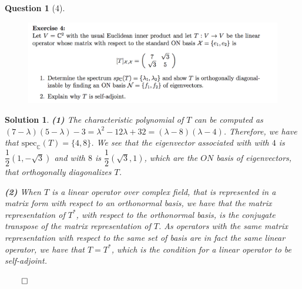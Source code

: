 \documentclass{article} %
\theoremstyle{quest}
\newtheorem*{question}{Question}
\newtheorem*{solution}{Solution}
\begin{document}
\begin{question}[4]
\hfill
\begin{figure}[h!]
  \centering
    \includegraphics[width=1\textwidth]{LA-4-4.png}
\end{figure}
\end{question}
\begin{solution}
\textbf{(1)} The characteristic polynomial of $T$ can be computed as $(7 - \lambda)(5 - \lambda) -3
= \lambda^2 - 12\lambda + 32 = (\lambda - 8)(\lambda - 4)$. Therefore, we have that 
$\text{spec}_{\mathbb{C}}(T) = \{ 4, 8\}$. We see that the eigenvector associated with 
with $4$ is $\dfrac{1}{2}(1,-\sqrt{3})$ and with $8$ is $\dfrac{1}{2}(\sqrt{3},1)$, which 
are the $ON$ basis of eigenvectors, that orthogonally diagonalizes $T$. 

\smallskip

\textbf{(2)} When $T$ is a linear operator over complex field,
 that is represented in a matrix form with respect
to an orthonormal basis, we have that the matrix representation of $T^*$, with 
respect to the orthonormal basis, is the conjugate transpose
of the matrix representation of $T$. As operators with the same matrix representation
with respect to the same set of basis are in fact the same linear operator, we have that $T = T^*$,
which is the condition for a linear operator to be self-adjoint.

\hfill $\qed$ 
\end{solution}

\newpage
\end{document}
